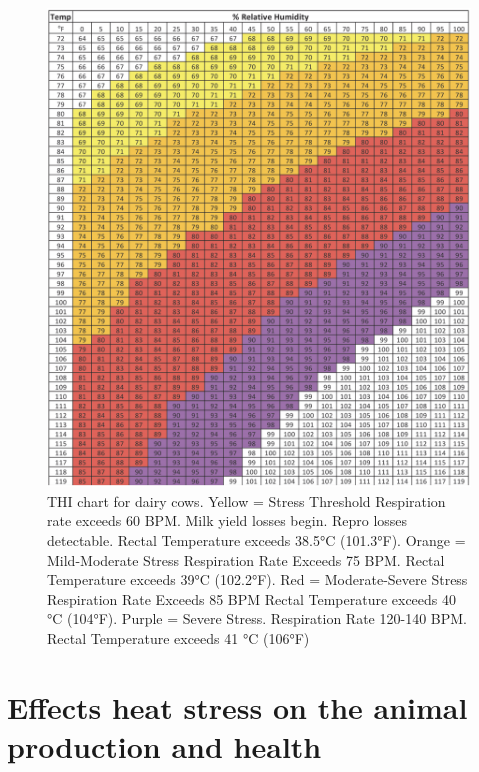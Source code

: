 \documentclass[]{book}
\begin{document}
\begin{figure}

{\centering \includegraphics[width=1\linewidth]{figures/THI} 

}

\caption{THI chart for dairy cows. Yellow = Stress Threshold Respiration rate exceeds 60 BPM. Milk yield losses begin. Repro losses detectable. Rectal Temperature exceeds 38.5°C (101.3°F). Orange = Mild-Moderate Stress Respiration Rate Exceeds 75 BPM. Rectal Temperature exceeds 39°C (102.2°F). Red = Moderate-Severe Stress Respiration Rate Exceeds 85 BPM Rectal Temperature exceeds 40 °C (104°F). Purple = Severe Stress. Respiration Rate 120-140 BPM. Rectal Temperature exceeds 41 °C (106°F)}\label{fig:THI}
\end{figure}

\hypertarget{effects-heat-stress-on-the-animal-production-and-health}{%
\section{Effects heat stress on the animal production and health}\label{effects-heat-stress-on-the-animal-production-and-health}}
\end{document}
